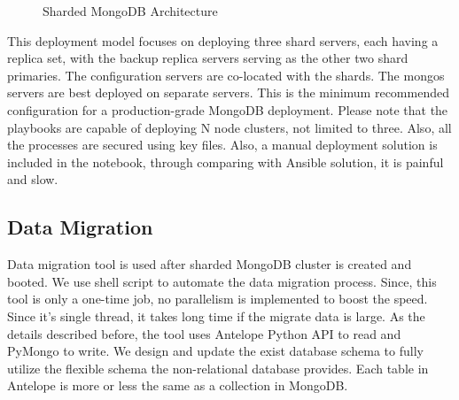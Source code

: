 \documentclass[9pt,twocolumn,twoside]{../../styles/osajnl}
\begin{document}
\begin{figure}[htbp]
\centering
{}
\caption{Sharded MongoDB Architecture \cite{www-ansimongo}}
\label{fig:mongodb-arch}
\end{figure}

 This deployment model focuses on deploying three shard servers, each having a replica set, with the backup replica servers serving as the other two shard primaries. The configuration servers are co-located with the shards. The mongos servers are best deployed on separate servers. This is the minimum recommended configuration for a production-grade MongoDB deployment. Please note that the playbooks are capable of deploying N node clusters, not limited to three. Also, all the processes are secured using key files. Also, a manual deployment solution is included in the notebook, through comparing with Ansible solution,  it is painful and slow.

\subsection{Data Migration}

Data migration tool is used after sharded MongoDB cluster is created and booted. We use shell script to automate the data migration process. Since, this tool is only a one-time job, no parallelism is implemented to boost the speed. Since it's single thread, it takes long time if the migrate data is large. As the details described before, the tool uses Antelope Python API to read and PyMongo to write. We design and update the exist database schema to fully utilize the flexible schema the non-relational database provides. Each table in Antelope is more or less the same as a collection in MongoDB.
\end{document}
